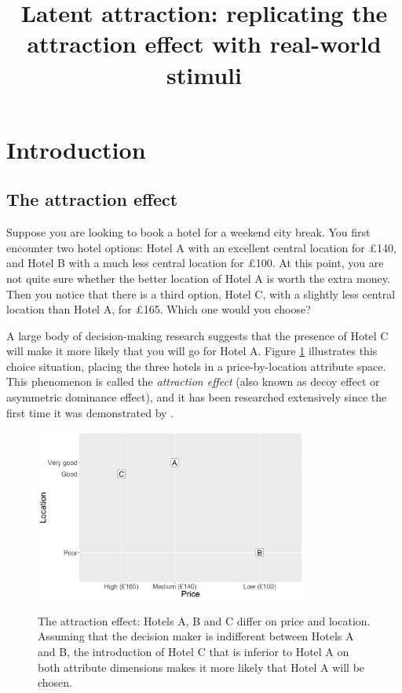 \documentclass[11pt,a4paper]{article}
\title{Latent attraction: replicating the attraction effect with real-world stimuli}
\begin{document}

\section{Introduction} 

\subsection{The attraction effect} \label{AE intro}

Suppose you are looking to book a hotel for a weekend city break. You first encounter two hotel options: Hotel A with an excellent central location for £140, and Hotel B with a much less central location for £100. At this point, you are not quite sure whether the better location of Hotel A is worth the extra money. Then you notice that there is a third option, Hotel C, with a slightly less central location than Hotel A, for £165. Which one would you choose?


A large body of decision-making research suggests that the presence of Hotel C will make it more likely that you will go for Hotel A. Figure \ref{fig:exp1_intro} illustrates this choice situation, placing the three hotels in a price-by-location attribute space. This phenomenon is called the \textit{attraction effect} (also known as decoy effect or asymmetric dominance effect), and it has been researched extensively since the first time it was demonstrated by .

\begin{figure}[htb]
\centering
\captionsetup{justification=centering}
\caption{The attraction effect: Hotels A, B and C differ on price and location. Assuming that the decision maker is indifferent between Hotels A and B, the introduction of Hotel C that is inferior to Hotel A on both attribute dimensions makes it more likely that Hotel A will be chosen.}
\includegraphics[width=0.8\textwidth]{exp1_intro.png}
\label{fig:exp1_intro}
\end{figure}
\end{document}

